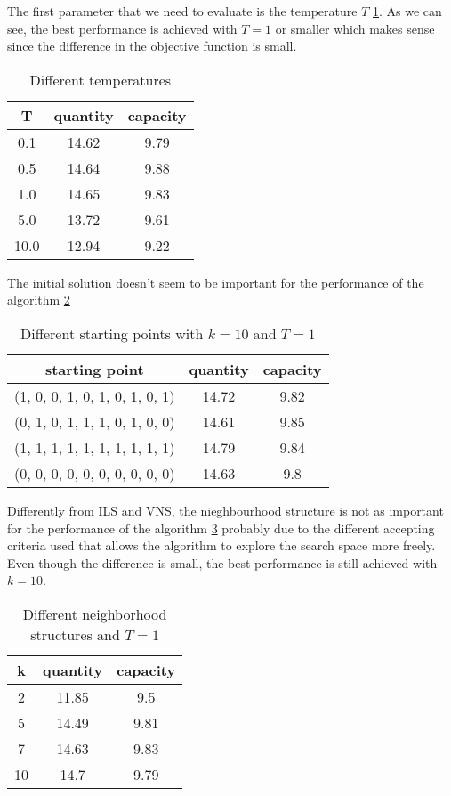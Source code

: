 The first parameter that we need to evaluate is the temperature $T$ \ref{tab:sa-temp}. As we can see, the best performance is achieved with $T=1$ or smaller which makes sense since the difference in the objective function is small.
\begin{table}[H]
    \centering
    \begin{tabular}{c||c |c}
        T    & quantity & capacity \\ \hline
        0.1  & 14.62    & 9.79     \\
        0.5  & 14.64    & 9.88     \\
        1.0  & 14.65    & 9.83     \\
        5.0  & 13.72    & 9.61     \\
        10.0 & 12.94    & 9.22     \\
    \end{tabular}
    \caption{Different temperatures}
    \label{tab:sa-temp}
\end{table}

The initial solution doesn't seem to be important for the performance of the algorithm \ref{tab:sa-start}
\begin{table}[H]
    \centering
    \begin{tabular}{c||c |c}
        starting point                 & quantity & capacity \\ \hline
        (1, 0, 0, 1, 0, 1, 0, 1, 0, 1) & 14.72    & 9.82     \\
        (0, 1, 0, 1, 1, 1, 0, 1, 0, 0) & 14.61    & 9.85     \\
        (1, 1, 1, 1, 1, 1, 1, 1, 1, 1) & 14.79    & 9.84     \\
        (0, 0, 0, 0, 0, 0, 0, 0, 0, 0) & 14.63    & 9.8      \\
    \end{tabular}
    \caption{Different starting points with $k=10$ and $T=1$}
    \label{tab:sa-start}
\end{table}

Differently from ILS and VNS, the nieghbourhood structure is not as important for the performance of the algorithm \ref{tab:sa-neigh} probably due to the different accepting criteria used that allows the algorithm to explore the search space more freely. Even though the difference is small, the best performance is still achieved with $k=10$.
\begin{table}[H]
    \centering
    \begin{tabular}{c||c |c}
        k  & quantity & capacity \\ \hline
        2  & 11.85    & 9.5      \\
        5  & 14.49    & 9.81     \\
        7  & 14.63    & 9.83     \\
        10 & 14.7     & 9.79     \\
    \end{tabular}
    \caption{Different neighborhood structures and $T=1$}
    \label{tab:sa-neigh}
\end{table}

